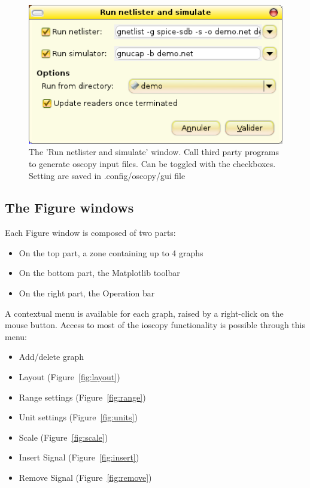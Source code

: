\documentclass[a4paper,11pt]{article}
\begin{document}
\begin{figure}[htbp]
  \includegraphics[scale=.5]{../png/ioscopy-netnsim.png}
  \caption{The 'Run netlister and simulate' window. Call third party programs to generate oscopy input files. Can be toggled with the checkboxes. Setting are saved in .config/oscopy/gui file}
  \label{fig:netnsim}

\end{figure}



\subsection{The Figure windows}

Each Figure window is composed of two parts:
\begin{itemize}
\item On the top part, a zone containing up to 4 graphs
\item On the bottom part, the Matplotlib toolbar
\item On the right part, the Operation bar
\end{itemize}
A contextual menu is available for each graph, raised by a right-click on the mouse button.
Access to most of the ioscopy functionality is possible through this menu:
\begin{itemize}
\item Add/delete graph
\item Layout (Figure~\ref{fig:layout})
\item Range settings (Figure~\ref{fig:range})
\item Unit settings (Figure~\ref{fig:units})
\item Scale (Figure~\ref{fig:scale})
\item Insert Signal (Figure~\ref{fig:insert})
\item Remove Signal (Figure~\ref{fig:remove})
\end{itemize}
\end{document}
